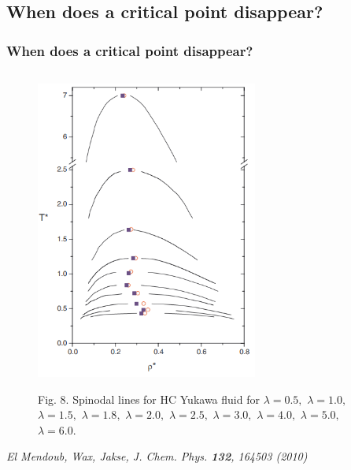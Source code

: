\documentclass[8pt]{beamer}
\begin{document}
	\subsection{When does a critical point disappear?}
	
	\begin{frame}
		\frametitle{When does a critical point disappear?}
		
		\begin{columns}
			\begin{column}{0.5\textwidth}
				\begin{figure}[htbp]
					\includegraphics[width=0.65\textwidth,angle=0]{limit_cp_spinodals} \\
					\parbox{1.0\textwidth}{\caption*{Fig. 8. Spinodal lines for HC Yukawa fluid for $\lambda = 0.5,$ $\lambda = 1.0,$ $\lambda = 1.5,$ $\lambda = 1.8,$ $\lambda = 2.0,$ $\lambda = 2.5,$ $\lambda = 3.0,$ $\lambda = 4.0,$ $\lambda = 5.0,$ $\lambda = 6.0$.
					}}
				\end{figure}
				
				\textit{El Mendoub, Wax, Jakse, J. Chem. Phys. \textbf{132}, 164503 (2010)}
			\end{column}
			

\end{columns}
\end{frame}
\end{document}
